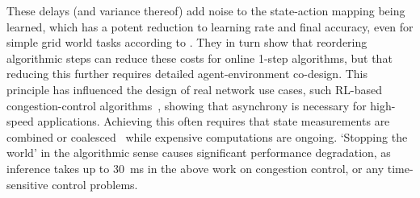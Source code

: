 \documentclass[sigconf,natbib=false]{acmart}
\begin{document}
These delays (and variance thereof) add noise to the state-action mapping being learned, which has a potent reduction to learning rate and final accuracy, even for simple grid world tasks according to \textcite{DBLP:journals/firai/TravnikMSP18}.
They in turn show that reordering algorithmic steps can reduce these costs for online 1-step algorithms, but that reducing this further requires detailed agent-environment co-design.
This principle has influenced the design of real network use cases, such RL-based congestion-control algorithms~\parencite{DBLP:journals/corr/abs-1910-04054}, showing that asynchrony is necessary for high-speed applications.
Achieving this often requires that state measurements are combined or coalesced~\parencite{DBLP:journals/corr/abs-1910-04054,DBLP:journals/tnsm/SimpsonRP20} while expensive computations are ongoing.
`Stopping the world' in the algorithmic sense causes significant performance degradation, as inference takes up to \SI{30}{\milli\second} in the above work on congestion control, or any time-sensitive control problems.
\end{document}
